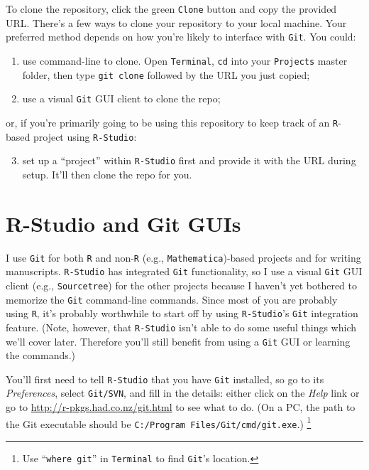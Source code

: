 \documentclass[12pt,letterpaper]{article}
\begin{document}
To clone the repository, 
click the green \texttt{Clone} button and copy the provided URL.
There's a few ways to clone your repository to your local machine.
Your preferred method depends on how you're likely to interface with \texttt{Git}.
You could:
\begin{enumerate}
	\item use command-line to clone.  
	Open \texttt{Terminal}, \texttt{cd} into your \texttt{Projects} master folder, 
	then type \texttt{git clone} followed by the URL you just copied;
	\item use a visual \texttt{Git} GUI client to clone the repo;
\end{enumerate}
or, if you're primarily going to be using this repository to keep track of an \texttt{R}-based project using \texttt{R-Studio}:
\begin{enumerate}
  \setcounter{enumi}{2}
	\item set up a ``project'' within \texttt{R-Studio} first and provide it with the URL during setup.  It'll then clone the repo for you.
\end{enumerate}

\section{R-Studio and Git GUIs}
I use \texttt{Git} for both \texttt{R} and non-\texttt{R} (e.g.,  \texttt{Mathematica})-based projects and for writing manuscripts.
\texttt{R-Studio} has integrated  \texttt{Git} functionality, 
so I use a visual \texttt{Git} GUI client
(e.g., \texttt{Sourcetree}) 
for the other projects because I haven't yet bothered to memorize the \texttt{Git} command-line commands.
Since most of you are probably using \texttt{R}, 
it's probably worthwhile to start off by using \texttt{R-Studio}'s \texttt{Git} integration feature.
(Note, however, that \texttt{R-Studio} isn't able to do some useful things which 
we'll cover later.  
Therefore you'll still benefit from using a \texttt{Git} GUI or learning the commands.)

You'll first need to tell \texttt{R-Studio} that you have \texttt{Git} installed, 
so go to its \textit{Preferences}, 
select \texttt{Git/SVN},
and fill in the details: 
either click on the \textit{Help} link 
or go to \url{http://r-pkgs.had.co.nz/git.html} to see what to do.
(On a PC, the path to the Git executable should be \texttt{C:/Program 
	Files/Git/cmd/git.exe}.)
\unskip
\footnote{Use ``\texttt{where git}'' in \texttt{Terminal} to find \texttt{Git}'s 
location.}
\end{document}
